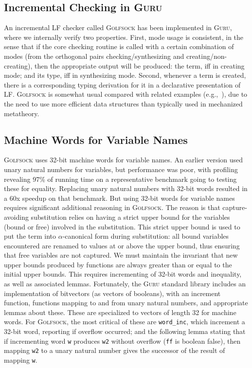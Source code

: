 \documentclass[preprint,natbib]{sigplanconf}
\begin{document}
\subsection{Incremental Checking in \textsc{Guru}}

An incremental LF checker called \textsc{Golfsock} has been
implemented in \textsc{Guru}, where we internally verify two
properties.  First, mode usage is consistent, in the sense that if the
core checking routine is called with a certain combination of modes
(from the orthogonal pairs checking/synthesizing and
creating/non-creating), then the appropriate output will be produced:
the term, iff in creating mode; and its type, iff in synthesizing
mode.  Second, whenever a term is created, there is a corresponding
typing derivation for it in a declarative presentation of LF.
\textsc{Golfsock} is somewhat usual compared with related examples
(e.g.,~\cite{urban+08}), due to the need to use more efficient data
structures than typically used in mechanized metatheory.

\subsection{Machine Words for Variable Names}

\textsc{Golfsock} uses 32-bit machine words for variable names.  An
earlier version used unary natural numbers for variables, but
performance was poor, with profiling revealing 97\% of running time on
a representative benchmark going to testing these for equality.
Replacing unary natural numbers with 32-bit words resulted in a 60x
speedup on that benchmark.  But using 32-bit words for variable names
requires significant additional reasoning in \textsc{Golfsock}.  The
reason is that capture-avoiding substitution relies on having a strict
upper bound for the variables (bound or free) involved in the
substitution.  This strict upper bound is used to put the term into
$\alpha$-canonical form during substitution: all bound variables
encountered are renamed to values at or above the upper bound, thus
ensuring that free variables are not captured.  We must maintain the
invariant that new upper bounds produced by functions are always
greater than or equal to the initial upper bounds.  This requires
incrementing of 32-bit words and inequality, as well as associated
lemmas.  Fortunately, the \textsc{Guru} standard library includes an
implementation of bitvectors (as vectors of booleans), with an
increment function, functions mapping to and from unary natural
numbers, and appropriate lemmas about these.  These are specialized to
vectors of length 32 for machine words.  For \textsc{Golfsock}, the
most critical of these are \texttt{word\_inc}, which increment a
32-bit word, reporting if overflow occurred; and the following lemma
stating that if incrementing word \texttt{w} produces \texttt{w2}
without overflow (\texttt{ff} is boolean false), then mapping
\texttt{w2} to a unary natural number gives the successor of the 
result of mapping \texttt{w}.
\end{document}
